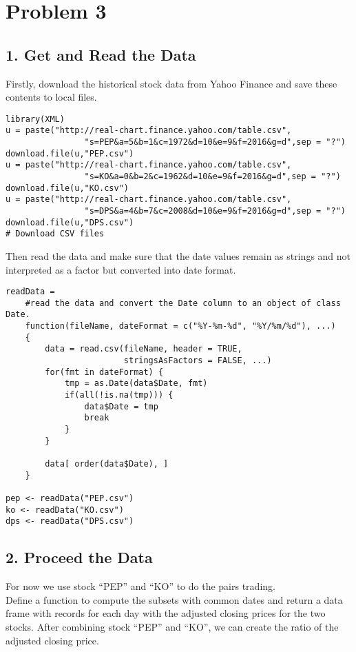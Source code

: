 \documentclass{article}
\begin{document}
\section*{Problem 3}
\subsection*{1. Get and Read the Data}
Firstly, download the historical stock data from Yahoo Finance and save these contents to local files. 
\begin{verbatim}
library(XML)
u = paste("http://real-chart.finance.yahoo.com/table.csv",
                "s=PEP&a=5&b=1&c=1972&d=10&e=9&f=2016&g=d",sep = "?")
download.file(u,"PEP.csv")
u = paste("http://real-chart.finance.yahoo.com/table.csv",
                "s=KO&a=0&b=2&c=1962&d=10&e=9&f=2016&g=d",sep = "?")
download.file(u,"KO.csv")
u = paste("http://real-chart.finance.yahoo.com/table.csv",
                "s=DPS&a=4&b=7&c=2008&d=10&e=9&f=2016&g=d",sep = "?")
download.file(u,"DPS.csv")
# Download CSV files
\end{verbatim}
Then read the data and make sure that the date values remain as strings and not interpreted as a factor but converted into date format.
\begin{verbatim}
readData =
    #read the data and convert the Date column to an object of class Date.  
    function(fileName, dateFormat = c("%Y-%m-%d", "%Y/%m/%d"), ...)
    {
        data = read.csv(fileName, header = TRUE, 
                        stringsAsFactors = FALSE, ...)
        for(fmt in dateFormat) {
            tmp = as.Date(data$Date, fmt)
            if(all(!is.na(tmp))) {
                data$Date = tmp
                break
            }
        }
        
        data[ order(data$Date), ]
    }

pep <- readData("PEP.csv")
ko <- readData("KO.csv")
dps <- readData("DPS.csv")
\end{verbatim}

\subsection*{2. Proceed the Data}

For now we use stock ``PEP'' and ``KO'' to do the pairs trading. \\

Define a function to compute the subsets with common dates and return a data frame with records for each day with the adjusted closing prices for the two stocks. After combining stock ``PEP'' and ``KO'', we can create the ratio of the adjusted closing price.
\end{document}
